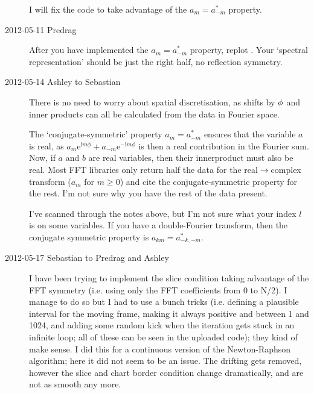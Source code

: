 \begin{description}
I will fix the code to take advantage of the $a_m=a^*_{-m}$ property.

\item[2012-05-11 Predrag]
After you have implemented the $a_m=a^*_{-m}$ property, replot
. Your `spectral representation' should be just the
right half, no reflection symmetry.

\item[2012-05-14 Ashley to Sebastian]
There is no need to worry about spatial discretisation,
as shifts by ${\bf \phi}$ and inner products can all be calculated from
the data in Fourier space.

The `conjugate-symmetric' property $a_m=a^*_{-m}$ ensures that the variable $a$ is real, as
$a_m\mathrm{e}^{\mathrm{i}m\phi}
+a_{-m}\mathrm{e}^{-\mathrm{i}m\phi}$ is then a real contribution in the Fourier sum.
Now, if $a$ and $b$ are real variables, then their innerproduct must
also be real.
Most FFT libraries only return half the data for the real$\to$complex
transform ($a_m$ for $m\ge0$) and cite the conjugate-symmetric property for the rest.  I'm not sure why you have the rest of the data present.

I've scanned through the notes above, but I'm not sure what your index
$l$ is on some variables.  If you have a double-Fourier transform,
then the conjugate symmetric property is
$a_{km}=a^*_{-k,-m}$.

\item[2012-05-17 Sebastian to Predrag and Ashley]
I have been trying to implement the slice condition taking advantage of
the FFT symmetry (i.e. using only the FFT coefficients from 0 to N/2). I
manage to do so but I had to use a bunch tricks (i.e. defining a
plausible interval for the moving frame, making it always positive and
between 1 and 1024, and adding some random kick when the iteration gets
stuck in an infinite loop; all of these can be seen in the uploaded
code); they kind of make sense. I did this for a continuous version of
the Newton-Raphson algorithm; here it did not seem to be an issue. The
drifting gets removed, however the slice and chart border condition
change dramatically, and are not as smooth any more.


\end{description}
